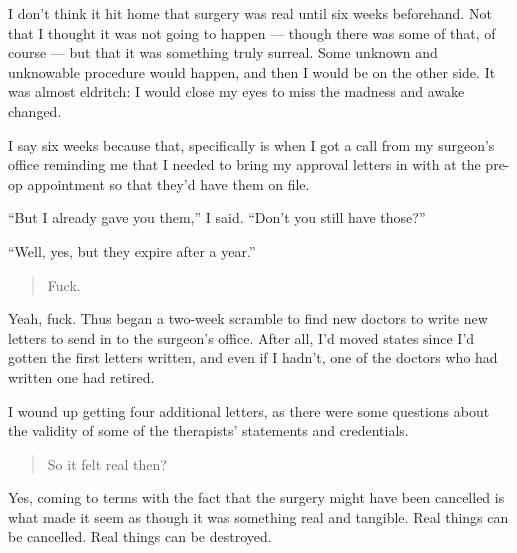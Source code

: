 I don't think it hit home that surgery was real until six weeks beforehand. Not that I thought it was not going to happen --- though there was some of that, of course --- but that it was something truly surreal. Some unknown and unknowable procedure would happen, and then I would be on the other side. It was almost eldritch: I would close my eyes to miss the madness and awake changed.

I say six weeks because that, specifically is when I got a call from my surgeon's office reminding me that I needed to bring my approval letters in with at the pre-op appointment so that they'd have them on file.

``But I already gave you them,'' I said. ``Don't you still have those?''

``Well, yes, but they expire after a year.''

\begin{quote}
Fuck.
\end{quote}

Yeah, fuck. Thus began a two-week scramble to find new doctors to write new letters to send in to the surgeon's office. After all, I'd moved states since I'd gotten the first letters written, and even if I hadn't, one of the doctors who had written one had retired.

I wound up getting four additional letters, as there were some questions about the validity of some of the therapists' statements and credentials.

\begin{quote}
So it felt real then?
\end{quote}

Yes, coming to terms with the fact that the surgery might have been cancelled is what made it seem as though it was something real and tangible. Real things can be cancelled. Real things can be destroyed.
